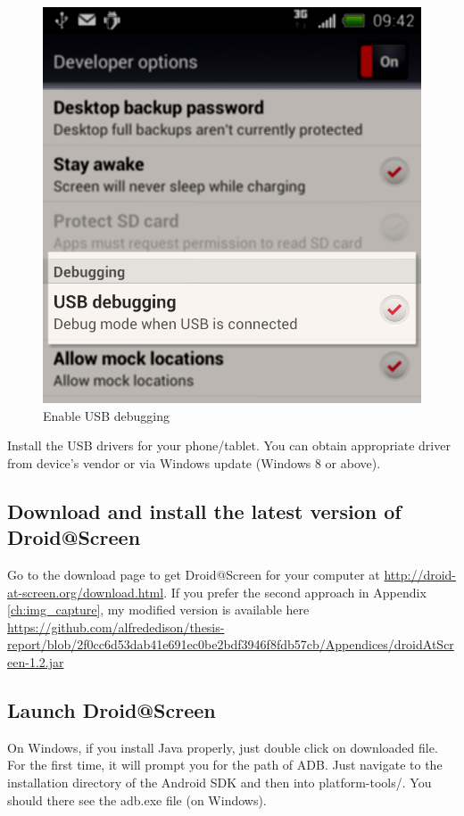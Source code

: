     \begin{figure}[H]
		\centering
		\includegraphics[scale=0.65]{Chapters/Fig/usb-db.png}
		\caption{Enable USB debugging}
		\label{fig:usb-db}
	\end{figure}
	
Install the USB drivers for your phone/tablet. You can obtain appropriate driver from device's vendor or via Windows update (Windows 8 or above).

\subsection{Download and install the latest version of Droid@Screen}
Go to the download page to get Droid@Screen for your computer at \url{http://droid-at-screen.org/download.html}.
If you prefer the second approach in Appendix \ref{ch:img_capture}, my modified version is available here \url{https://github.com/alfrededison/thesis-report/blob/2f0cc6d53dab41e691ec0be2bdf3946f8fdb57cb/Appendices/droidAtScreen-1.2.jar}

\subsection{Launch Droid@Screen}
On Windows, if you install Java properly, just double click on downloaded file.
\newline
For the first time, it will prompt you for the path of ADB. Just navigate to the installation directory of the Android SDK and then into platform-tools/. You should there see the adb.exe file (on Windows).

